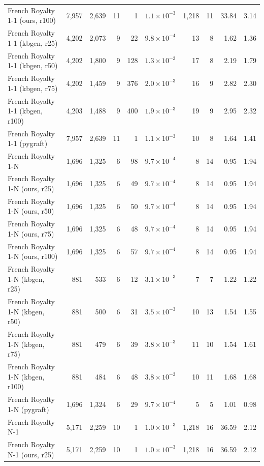 \begin{tabular}{lrrrrrrrrr}
French Royalty 1-1 (ours, r100) & 7{,}957 & 2{,}639 & 11 & 1 & $1.1\times10^{-3}$ & 1{,}218 & 11 & 33.84 & 3.14 \\
French Royalty 1-1 (kbgen, r25) & 4{,}202 & 2{,}073 & 9 & 22 & $9.8\times10^{-4}$ & 13 & 8 & 1.62 & 1.36 \\
French Royalty 1-1 (kbgen, r50) & 4{,}202 & 1{,}800 & 9 & 128 & $1.3\times10^{-3}$ & 17 & 8 & 2.19 & 1.79 \\
French Royalty 1-1 (kbgen, r75) & 4{,}202 & 1{,}459 & 9 & 376 & $2.0\times10^{-3}$ & 16 & 9 & 2.82 & 2.30 \\
French Royalty 1-1 (kbgen, r100) & 4{,}203 & 1{,}488 & 9 & 400 & $1.9\times10^{-3}$ & 19 & 9 & 2.95 & 2.32 \\
French Royalty 1-1 (pygraft) & 7{,}957 & 2{,}639 & 11 & 1 & $1.1\times10^{-3}$ & 10 & 8 & 1.64 & 1.41 \\
\midrule
French Royalty 1-N & 1{,}696 & 1{,}325 & 6 & 98 & $9.7\times10^{-4}$ & 8 & 14 & 0.95 & 1.94 \\
French Royalty 1-N (ours, r25) & 1{,}696 & 1{,}325 & 6 & 49 & $9.7\times10^{-4}$ & 8 & 14 & 0.95 & 1.94 \\
French Royalty 1-N (ours, r50) & 1{,}696 & 1{,}325 & 6 & 50 & $9.7\times10^{-4}$ & 8 & 14 & 0.95 & 1.94 \\
French Royalty 1-N (ours, r75) & 1{,}696 & 1{,}325 & 6 & 48 & $9.7\times10^{-4}$ & 8 & 14 & 0.95 & 1.94 \\
French Royalty 1-N (ours, r100) & 1{,}696 & 1{,}325 & 6 & 57 & $9.7\times10^{-4}$ & 8 & 14 & 0.95 & 1.94 \\
French Royalty 1-N (kbgen, r25) & 881 & 533 & 6 & 12 & $3.1\times10^{-3}$ & 7 & 7 & 1.22 & 1.22 \\
French Royalty 1-N (kbgen, r50) & 881 & 500 & 6 & 31 & $3.5\times10^{-3}$ & 10 & 13 & 1.54 & 1.55 \\
French Royalty 1-N (kbgen, r75) & 881 & 479 & 6 & 39 & $3.8\times10^{-3}$ & 11 & 10 & 1.54 & 1.61 \\
French Royalty 1-N (kbgen, r100) & 881 & 484 & 6 & 48 & $3.8\times10^{-3}$ & 10 & 11 & 1.68 & 1.68 \\
French Royalty 1-N (pygraft) & 1{,}696 & 1{,}324 & 6 & 29 & $9.7\times10^{-4}$ & 5 & 5 & 1.01 & 0.98 \\
\midrule
French Royalty N-1 & 5{,}171 & 2{,}259 & 10 & 1 & $1.0\times10^{-3}$ & 1{,}218 & 16 & 36.59 & 2.12 \\
French Royalty N-1 (ours, r25) & 5{,}171 & 2{,}259 & 10 & 1 & $1.0\times10^{-3}$ & 1{,}218 & 16 & 36.59 & 2.12 \\

\end{tabular}
